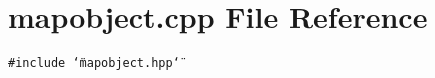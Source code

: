\section{mapobject.cpp File Reference}
\label{mapobject_8cpp}
{\tt \#include \char`\"{}mapobject.hpp\char`\"{}}\par
